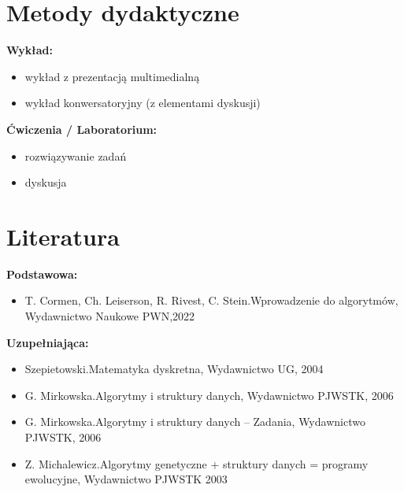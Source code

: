 \documentclass[12pt, a4paper]{article}
\begin{document}
\section{Metody dydaktyczne}

\textbf{Wykład:}
\begin{itemize}
  \item wykład z prezentacją multimedialną
  \item wykład konwersatoryjny (z elementami dyskusji)
\end{itemize}
\vspace{4pt}
\textbf{Ćwiczenia / Laboratorium:}
\begin{itemize}
  \item rozwiązywanie zadań
  \item dyskusja
\end{itemize}
\vspace{4pt}


\section{Literatura}

\textbf{Podstawowa:}
\begin{itemize}
  \item T. Cormen, Ch. Leiserson, R. Rivest, C. Stein.Wprowadzenie do algorytmów, Wydawnictwo Naukowe PWN,2022
\end{itemize}

\textbf{Uzupełniająca:}
\begin{itemize}
  \item Szepietowski.Matematyka dyskretna, Wydawnictwo UG, 2004
  \item G. Mirkowska.Algorytmy i struktury danych, Wydawnictwo PJWSTK, 2006
  \item G. Mirkowska.Algorytmy i struktury danych – Zadania, Wydawnictwo PJWSTK, 2006
  \item Z. Michalewicz.Algorytmy genetyczne + struktury danych = programy ewolucyjne, Wydawnictwo PJWSTK 2003
\end{itemize}
\end{document}
